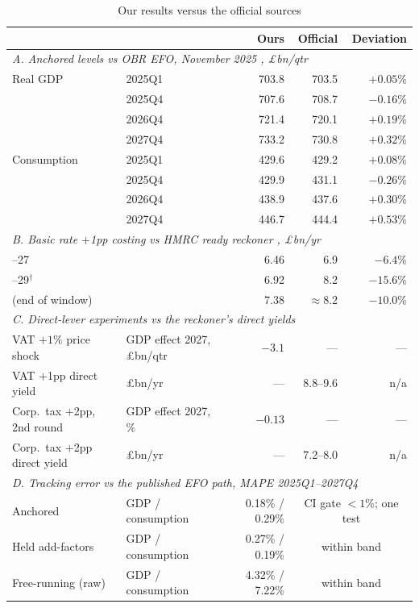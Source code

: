 \begin{table}[ht]
\centering
\caption{Our results versus the official sources}
\label{tab:comparison}
\small
\setlength{\tabcolsep}{3pt}
\begin{tabular}{llrrr}
\toprule
 & & Ours & Official & Deviation \\
\midrule
\multicolumn{5}{l}{\emph{A. Anchored levels vs OBR EFO, November 2025 \citep{obr2025efo}, \pounds bn/qtr}}\\
\quad Real GDP & 2025Q1 & 703.8 & 703.5 & $+0.05\%$ \\
\quad          & 2025Q4 & 707.6 & 708.7 & $-0.16\%$ \\
\quad          & 2026Q4 & 721.4 & 720.1 & $+0.19\%$ \\
\quad          & 2027Q4 & 733.2 & 730.8 & $+0.32\%$ \\
\quad Consumption & 2025Q1 & 429.6 & 429.2 & $+0.08\%$ \\
\quad             & 2025Q4 & 429.9 & 431.1 & $-0.26\%$ \\
\quad             & 2026Q4 & 438.9 & 437.6 & $+0.30\%$ \\
\quad             & 2027Q4 & 446.7 & 444.4 & $+0.53\%$ \\
\midrule
\multicolumn{5}{l}{\emph{B. Basic rate $+$1pp costing vs HMRC ready reckoner \citep{hmrc2025reckoner}, \pounds bn/yr}}\\
\quad 2026--27 & & 6.46 & 6.9 & $-6.4\%$ \\
\quad 2028--29$^{\dagger}$ & & 6.92 & 8.2 & $-15.6\%$ \\
\quad 2030 (end of window) & & 7.38 & $\approx$8.2 & $-10.0\%$ \\
\midrule
\multicolumn{5}{l}{\emph{C. Direct-lever experiments vs the reckoner's direct yields \citep{hmrc2025reckoner}}}\\
\quad VAT $+1\%$ price shock & GDP effect 2027, \pounds bn/qtr & $-3.1$ & --- & --- \\
\quad VAT $+$1pp direct yield & \pounds bn/yr & --- & 8.8--9.6 & n/a \\
\quad Corp.\ tax $+$2pp, 2nd round & GDP effect 2027, \% & $-0.13$ & --- & --- \\
\quad Corp.\ tax $+$2pp direct yield & \pounds bn/yr & --- & 7.2--8.0 & n/a \\
\midrule
\multicolumn{5}{l}{\emph{D. Tracking error vs the published EFO path, MAPE 2025Q1--2027Q4}}\\
\quad Anchored & GDP / consumption & 0.18\% / 0.29\% & \multicolumn{2}{c}{CI gate $<1\%$; one test} \\
\quad Held add-factors & GDP / consumption & 0.27\% / 0.19\% & \multicolumn{2}{c}{within band} \\
\quad Free-running (raw) & GDP / consumption & 4.32\% / 7.22\% & \multicolumn{2}{c}{within band} \\
\bottomrule
\end{tabular}


\end{table}
